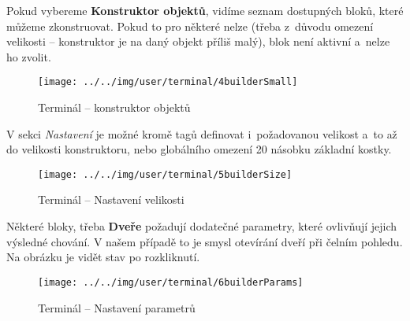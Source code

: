 \FloatBarrier

Pokud vybereme \textbf{Konstruktor objektů}, vidíme seznam dostupných bloků, které můžeme zkonstruovat. Pokud to pro některé nelze (třeba z~důvodu omezení velikosti -- konstruktor je na daný objekt příliš malý), blok není aktivní a~nelze ho zvolit.


\begin{figure}[!ht]\centering
\texttt{[image: ../../img/user/terminal/4builderSmall]}

\caption{Terminál -- konstruktor objektů}
\label{fig:user_terminal_4builderSmall}

\end{figure}

\FloatBarrier

V sekci \textit{Nastavení} je možné kromě tagů definovat i~požadovanou velikost a~to až do velikosti konstruktoru, nebo globálního omezení 20 násobku základní kostky.

\begin{figure}[!ht]\centering
\texttt{[image: ../../img/user/terminal/5builderSize]}

\caption{Terminál -- Nastavení velikosti}
\label{fig:user_terminal_5builderSize}

\end{figure}

\FloatBarrier

Některé bloky, třeba \textbf{Dveře} požadují dodatečné parametry, které ovlivňují jejich výsledné chování. V našem případě to je smysl otevírání dveří při čelním pohledu. Na obrázku je vidět stav po rozkliknutí.

\begin{figure}[!ht]\centering
\texttt{[image: ../../img/user/terminal/6builderParams]}

\caption{Terminál -- Nastavení parametrů}
\label{fig:user_terminal_6builderParams}

\end{figure}

\FloatBarrier